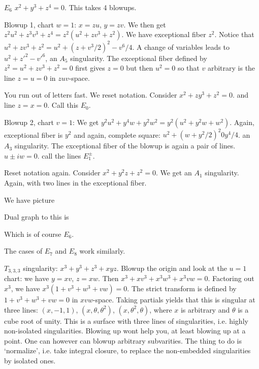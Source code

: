 \begin{ex}
$E_6$ $x^2+y^3+z^4=0$. This takes 4 blowups. 

Blowup 1, chart $w=1$: $x=zu$, $y=zv$. We then get $z^2u^2+z^3v^3+z^4= z^2(u^2+zv^3+z^2)$. We have exceptional fiber $z^2$. Notice that $u^2+zv^3+z^2= u^2+ (z+v^3/2)^2 - v^6/4$. A change of variables leads to $u^2+z'^2 - v'^6$, an $A_5$ singularity. The exceptional fiber defined by $z^2=u^2+zv^3+z^2=0$ first gives $z=0$ but then $u^2=0$ so that $v$ arbitrary is the line $z=u=0$ in $zuv$-space. 

You run out of letters fast. We reset notation. Consider $x^2+zy^3+z^2=0$. and line $z=x=0$. Call this $E_0$. 

Blowup 2, chart $v=1$: We get $y^2u^2+y^4w+y^2w^2= y^2(u^2+y^2w+w^2)$. Again, exceptional fiber is $y^2$ and again, complete square: $u^2+(w+y^2/2)^2 0 y^4/4$. an $A_3$ singularity. The exceptional fiber of the blowup is again a pair of lines. $u \pm iw=0$. call the lines $E_1^\pm$. 

Reset notation again. Consider $x^2+y^2z+z^2=0$. We get an $A_1$ singularity. Again, with two lines in the exceptional fiber. 

We have picture


Dual graph to this is 

Which is of course $E_6$. 

The cases of $E_7$ and $E_8$ work similarly. 
\end{ex}



\begin{ex}
$T_{3,3,3}$ singularity: $x^3+y^3+z^3+xyz$. Blowup the origin and look at the $u=1$ chart: we have $y=xv$, $z= xw$. Then $x^3+xv^3+x^3w^3+x^3vw= 0$. Factoring out $x^3$, we have $x^3(1+v^3+w^3+vw)=0$. The strict transform is defined by $1+v^3+w^3+vw=0$ in $xvw$-space. Taking partials yields that this is singular at three lines: $(x,-1,1)$, $(x,\theta,\theta^2)$, $(x,\theta^2,\theta)$, where $x$ is arbitrary and $\theta$ is a cube root of unity. This is a surface with three lines of singularities, i.e. highly non-isolated singularities. Blowing up wont help you, at least blowing up at a point. One can however can blowup arbitrary subvarities. The thing to do is `normalize', i.e. take integral closure, to replace the non-embedded singularities by isolated ones. 
\end{ex}



